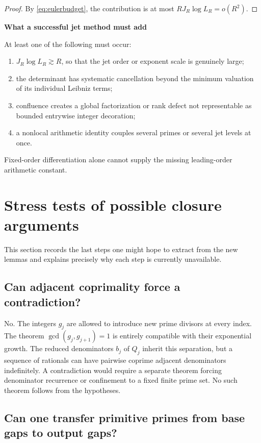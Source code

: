 \documentclass[11pt,oneside]{article}
\theoremstyle{definition}
\theoremstyle{remark}
\newenvironment{claimbox}[1]{%
  \def\FrameCommand{\fcolorbox{deepblue}{softblue}}%
  \MakeFramed{\advance\hsize-2\width\FrameRestore}%
  \noindent\textbf{#1}\par\smallskip
}{\endMakeFramed}
\begin{document}
\begin{proof}
By \eqref{eq:eulerbudget}, the contribution is at most
$R J_R\log L_R=o(R^2)$.
\end{proof}

\begin{claimbox}{What a successful jet method must add}
At least one of the following must occur:
\begin{enumerate}[label=(\alph*)]
\item $J_R\log L_R\gtrsim R$, so that the jet order or exponent scale is
  genuinely large;
\item the determinant has systematic cancellation beyond the minimum
  valuation of its individual Leibniz terms;
\item confluence creates a global factorization or rank defect not representable
  as bounded entrywise integer decoration;
\item a nonlocal arithmetic identity couples several primes or several jet
  levels at once.
\end{enumerate}
Fixed-order differentiation alone cannot supply the missing leading-order
arithmetic constant.
\end{claimbox}

\section{Stress tests of possible closure arguments}
\label{sec:stress}

This section records the last steps one might hope to extract from the new
lemmas and explains precisely why each step is currently unavailable.

\subsection{Can adjacent coprimality force a contradiction?}

No.  The integers $g_j$ are allowed to introduce new prime divisors at every
index.  The theorem $\gcd(g_j,g_{j+1})=1$ is entirely compatible with their
exponential growth.  The reduced denominators $b_j$ of $Q_j$ inherit this
separation, but a sequence of rationals can have pairwise coprime adjacent
denominators indefinitely.  A contradiction would require a separate theorem
forcing denominator recurrence or confinement to a fixed finite prime set.
No such theorem follows from the hypotheses.

\subsection{Can one transfer primitive primes from base gaps to output gaps?}
\end{document}
